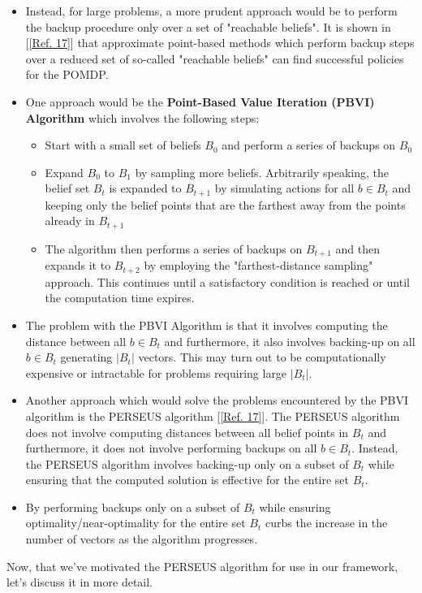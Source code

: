 \documentclass[12pt, draftcls, onecolumn]{IEEEtran}
\begin{document}
\begin{itemize}
\begin{itemize}
        \item Instead, for large problems, a more prudent approach would be to perform the backup procedure only over a set of "reachable beliefs". It is shown in [\ref{Ref. 17}] that approximate point-based methods which perform backup steps over a reduced set of so-called "reachable beliefs" can find successful policies for the POMDP.
        \item One approach would be the \textbf{Point-Based Value Iteration (PBVI) Algorithm} which involves the following steps:
        \begin{itemize}
            \item Start with a small set of beliefs $B_0$ and perform a series of backups on $B_0$
            \item Expand $B_0$ to $B_1$ by sampling more beliefs. Arbitrarily speaking, the belief set $B_t$ is expanded to $B_{t+1}$ by simulating actions for all $b \in B_t$ and keeping only the belief points that are the farthest away from the points already in $B_{t+1}$
            \item The algorithm then performs a series of backups on $B_{t+1}$ and then expands it to $B_{t+2}$ by employing the "farthest-distance sampling" approach. This continues until a satisfactory condition is reached or until the computation time expires.
        \end{itemize}
        \item The problem with the PBVI Algorithm is that it involves computing the distance between all $b \in B_t$ and furthermore, it also involves backing-up on all $b \in B_t$ generating $|B_t|$ vectors. This may turn out to be computationally expensive or intractable for problems requiring large $|B_t|$.
        \item Another approach which would solve the problems encountered by the PBVI algorithm is the PERSEUS algorithm [\ref{Ref. 17}]. The PERSEUS algorithm does not involve computing distances between all belief points in $B_t$ and furthermore, it does not involve performing backups on all $b \in B_t$. Instead, the PERSEUS algorithm involves backing-up only on a subset of $B_t$ while ensuring that the computed solution is effective for the entire set $B_t$.
        \item By performing backups only on a subset of $B_t$ while ensuring optimality/near-optimality for the entire set $B_t$ curbs the increase in the number of vectors as the algorithm progresses.
    \end{itemize}
\end{itemize}
Now, that we've motivated the PERSEUS algorithm for use in our framework, let's discuss it in more detail.
\end{document}
